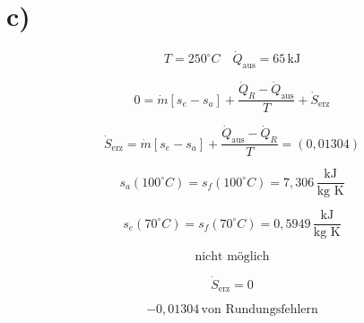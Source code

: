

\section*{c)}

\[
T = 250^\circ C \quad \dot{Q}_{\text{aus}} = 65 \, \text{kJ}
\]

\[
0 = \dot{m} \left[ s_e - s_a \right] + \frac{\dot{Q}_R - \dot{Q}_{\text{aus}}}{T} + \dot{S}_{\text{erz}}
\]

\[
\dot{S}_{\text{erz}} = \dot{m} \left[ s_e - s_a \right] + \frac{\dot{Q}_{\text{aus}} - \dot{Q}_R}{T} = (0,01304)
\]

\[
s_a (100^\circ C) = s_f (100^\circ C) = 7,306 \, \frac{\text{kJ}}{\text{kg K}}
\]

\[
s_e (70^\circ C) = s_f (70^\circ C) = 0,5949 \, \frac{\text{kJ}}{\text{kg K}}
\]

\[
\text{nicht möglich}
\]

\[
\dot{S}_{\text{erz}} = 0
\]

\[
-0,01304 \, \text{von Rundungsfehlern}
\]